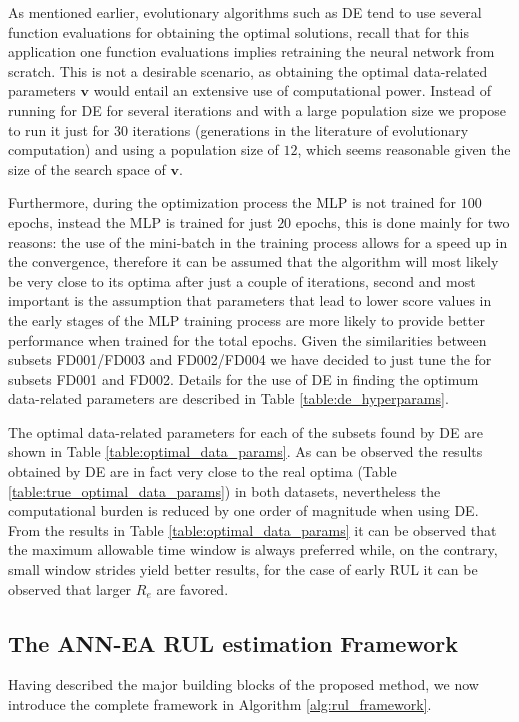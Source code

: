 \documentclass[12pt]{IEEEtran}%
\begin{document}
As mentioned earlier, evolutionary algorithms such as DE tend to use several
function evaluations for obtaining the optimal solutions, recall that for this
application one function evaluations implies retraining the neural network
from scratch. This is not a desirable scenario, as obtaining the optimal
data-related parameters $\mathbf{v}$ would entail an extensive use of
computational power. Instead of running for DE for several iterations and with
a large population size we propose to run it just for $30$ iterations
(generations in the literature of evolutionary computation) and using a
population size of $12$, which seems reasonable given the size of the search
space of $\mathbf{v}$.

Furthermore, during the optimization process the MLP is not trained for $100$
epochs, instead the MLP is trained for just $20$ epochs, this is done mainly
for two reasons: the use of the mini-batch in the training process allows for
a speed up in the convergence, therefore it can be assumed that the algorithm
will most likely be very close to its optima after just a couple of
iterations, second and most important is the assumption that parameters that
lead to lower score values in the early stages of the MLP training process are
more likely to provide better performance when trained for the total epochs.
Given the similarities between subsets FD001/FD003 and FD002/FD004 we have
decided to just tune the for subsets FD001 and FD002. Details for the use of
DE in finding the optimum data-related parameters are described in Table
\ref{table:de_hyperparams}.


The optimal data-related parameters for each of the subsets found by DE are
shown in Table \ref{table:optimal_data_params}. As can be observed the results
obtained by DE are in fact very close to the real optima (Table
\ref{table:true_optimal_data_params}) in both datasets, nevertheless the
computational burden is reduced by one order of magnitude when using DE. From
the results in Table \ref{table:optimal_data_params} it can be observed that
the maximum allowable time window is always preferred while, on the contrary,
small window strides yield better results, for the case of early RUL it can be
observed that larger $R_{e}$ are favored.


\subsection{The ANN-EA RUL estimation Framework}

Having described the major building blocks of the proposed method, we now
introduce the complete framework in Algorithm \ref{alg:rul_framework}.
\end{document}
